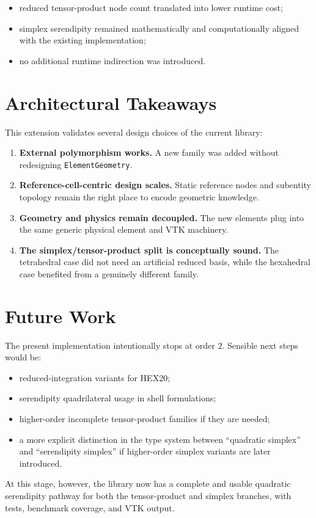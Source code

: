 \begin{itemize}[nosep]
  \item reduced tensor-product node count translated into lower runtime cost;
  \item simplex serendipity remained mathematically and computationally aligned
        with the existing implementation;
  \item no additional runtime indirection was introduced.
\end{itemize}


\section{Architectural Takeaways}
\label{sec:serendipity_takeaways}

This extension validates several design choices of the current library:

\begin{enumerate}[nosep]
  \item \textbf{External polymorphism works.}
        A new family was added without redesigning \texttt{ElementGeometry}.
  \item \textbf{Reference-cell-centric design scales.}
        Static reference nodes and subentity topology remain the right place to
        encode geometric knowledge.
  \item \textbf{Geometry and physics remain decoupled.}
        The new elements plug into the same generic physical element and VTK
        machinery.
  \item \textbf{The simplex/tensor-product split is conceptually sound.}
        The tetrahedral case did not need an artificial reduced basis, while
        the hexahedral case benefited from a genuinely different family.
\end{enumerate}


\section{Future Work}
\label{sec:serendipity_future}

The present implementation intentionally stops at order \(2\).  Sensible next
steps would be:

\begin{itemize}[nosep]
  \item reduced-integration variants for HEX20;
  \item serendipity quadrilateral usage in shell formulations;
  \item higher-order incomplete tensor-product families if they are needed;
  \item a more explicit distinction in the type system between
        ``quadratic simplex'' and ``serendipity simplex'' if higher-order
        simplex variants are later introduced.
\end{itemize}

At this stage, however, the library now has a complete and usable quadratic
serendipity pathway for both the tensor-product and simplex branches, with
tests, benchmark coverage, and VTK output.
